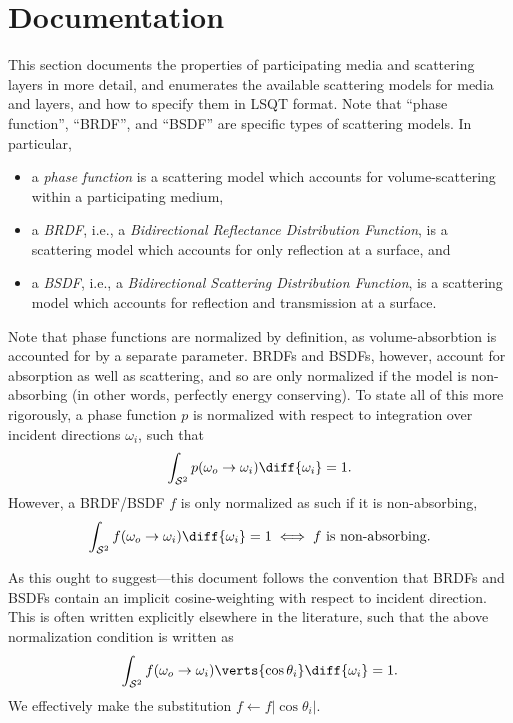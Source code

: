 \documentclass[
    twoside,
    twocolumn,
    letterpaper,
    10pt]{article}
\begin{document}
\section{Documentation}
\label{sec:doc}

This section documents the properties of participating media and 
scattering layers in more detail, and enumerates the available 
scattering models for media and layers, and how to specify them in 
LSQT format. Note that ``phase function'', ``BRDF'', and ``BSDF'' are
specific types of scattering models. In particular,
\begin{itemize}
    \item a \emph{phase function} is a scattering model which accounts
        for volume-scattering within a participating medium,
    \item a \emph{BRDF}, i.e., a \emph{Bidirectional Reflectance Distribution 
        Function}, is a scattering model which accounts for only reflection at 
        a surface, and
    \item a \emph{BSDF}, i.e., a \emph{Bidirectional Scattering Distribution 
        Function}, is a scattering model which accounts for reflection and 
        transmission at a surface.
\end{itemize}

Note that phase functions are normalized by 
definition, as volume-absorbtion is accounted for by a separate parameter. 
BRDFs and BSDFs, however, account for absorption as well as scattering, 
and so are only normalized if the model is non-absorbing (in other words,
perfectly energy conserving). To state all of this more rigorously, a
phase function $p$ is normalized with respect to integration over 
incident directions $\omega_i$, such that
\begin{equation*}
    \int_{\mathcal{S}^2} p(\omega_o\to\omega_i) \diff{\omega_i} = 1.
\end{equation*}
However, a BRDF/BSDF $f$ is only normalized as such if it is 
non-absorbing,
\begin{equation*}
    \int_{\mathcal{S}^2} f(\omega_o\to\omega_i) \diff{\omega_i} = 1
    \iff \text{$f$ is non-absorbing.}
\end{equation*}

As this ought to suggest---this document follows the convention that BRDFs 
and BSDFs contain an implicit cosine-weighting with respect to incident
direction. This is often written explicitly elsewhere in the literature,
such that the above normalization condition is written as
\begin{equation*}
    \int_{\mathcal{S}^2} f(\omega_o\to\omega_i) \verts{\cos{\theta_i}}
    \diff{\omega_i} = 1.
\end{equation*}
We effectively make the substitution $f\gets f|{\cos{\theta_i}}|$.
\end{document}
